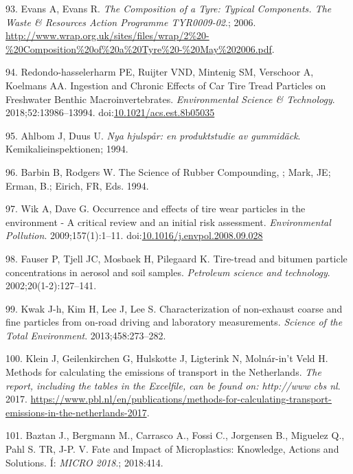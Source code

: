 \documentclass[icelandic,]{book}
\begin{document}
\leavevmode\hypertarget{ref-Evans2006}{}%
93. Evans A, Evans R. \emph{The Composition of a Tyre: Typical Components. The Waste \& Resources Action Programme TYR0009-02}.; 2006. \url{http://www.wrap.org.uk/sites/files/wrap/2\%20-\%20Composition\%20of\%20a\%20Tyre\%20-\%20May\%202006.pdf}.

\leavevmode\hypertarget{ref-Redondo-hasselerharm2018}{}%
94. Redondo-hasselerharm PE, Ruijter VND, Mintenig SM, Verschoor A, Koelmans AA. Ingestion and Chronic Effects of Car Tire Tread Particles on Freshwater Benthic Macroinvertebrates. \emph{Environmental Science \& Technology}. 2018;52:13986--13994. doi:\href{https://doi.org/10.1021/acs.est.8b05035}{10.1021/acs.est.8b05035}

\leavevmode\hypertarget{ref-ahlbom1994nya}{}%
95. Ahlbom J, Duus U. \emph{Nya hjulspår: en produktstudie av gummidäck}. Kemikalieinspektionen; 1994.

\leavevmode\hypertarget{ref-barbin1994science}{}%
96. Barbin B, Rodgers W. The Science of Rubber Compounding, ; Mark, JE; Erman, B.; Eirich, FR, Eds. 1994.

\leavevmode\hypertarget{ref-Wik2009}{}%
97. Wik A, Dave G. Occurrence and effects of tire wear particles in the environment - A critical review and an initial risk assessment. \emph{Environmental Pollution}. 2009;157(1):1--11. doi:\href{https://doi.org/10.1016/j.envpol.2008.09.028}{10.1016/j.envpol.2008.09.028}

\leavevmode\hypertarget{ref-fauser2002tire}{}%
98. Fauser P, Tjell JC, Mosbaek H, Pilegaard K. Tire-tread and bitumen particle concentrations in aerosol and soil samples. \emph{Petroleum science and technology}. 2002;20(1-2):127--141.

\leavevmode\hypertarget{ref-kwak2013characterization}{}%
99. Kwak J-h, Kim H, Lee J, Lee S. Characterization of non-exhaust coarse and fine particles from on-road driving and laboratory measurements. \emph{Science of the Total Environment}. 2013;458:273--282.

\leavevmode\hypertarget{ref-klein2017methods}{}%
100. Klein J, Geilenkirchen G, Hulskotte J, Ligterink N, Molnár-in't Veld H. Methods for calculating the emissions of transport in the Netherlands. \emph{The report, including the tables in the Excelfile, can be found on: http://www cbs nl}. 2017. \url{https://www.pbl.nl/en/publications/methods-for-calculating-transport-emissions-in-the-netherlands-2017}.

\leavevmode\hypertarget{ref-BaztanJ2018}{}%
101. Baztan J., Bergmann M., Carrasco A., Fossi C., Jorgensen B., Miguelez Q., Pahl S. TR, J-P. V. Fate and Impact of Microplastics: Knowledge, Actions and Solutions. Í: \emph{MICRO 2018}.; 2018:414.
\end{document}
